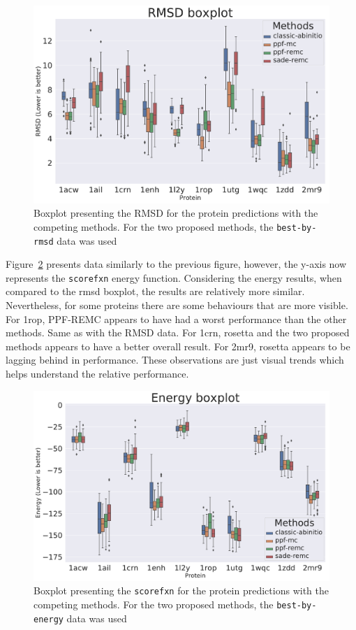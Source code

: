 \begin{figure}
  \includegraphics[width=\linewidth]{Figuras/boxplots/boxplot_best_by_rmsd_rmsd_after.pdf}
  \caption{Boxplot presenting the RMSD for the protein predictions with the
    competing methods. For the two proposed methods, the \texttt{best-by-rmsd}
    data was used}
  \label{fig:boxplot-rmsd}
\end{figure}

Figure~\ref{fig:boxplot-energy} presents data similarly to the previous figure,
however, the y-axis now represents the \texttt{scorefxn} energy function. Considering
the energy results, when compared to the rmsd boxplot, the results are relatively
more similar. Nevertheless, for some proteins there are some behaviours that are
more visible. For 1rop, PPF-REMC appears to have had a worst performance
than the other methods. Same as with the RMSD data. For 1crn, rosetta and the two
proposed methods appears to have a better overall result. For 2mr9, rosetta
appears to be lagging behind in performance. These observations are just visual
trends which helps understand the relative performance.

\begin{figure}
  \includegraphics[width=\linewidth]{Figuras/boxplots/boxplot_best_by_energy_scorefxn.pdf}
  \caption{Boxplot presenting the \texttt{scorefxn} for the protein predictions with the
    competing methods. For the two proposed methods, the \texttt{best-by-energy}
    data was used}
  \label{fig:boxplot-energy}
\end{figure}

